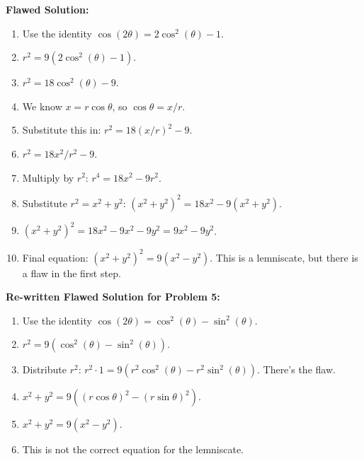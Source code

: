 \documentclass{article}
\begin{document}
\textbf{Flawed Solution:}
\begin{enumerate}
    \item Use the identity \(\cos(2\theta) = 2\cos^2(\theta) - 1\).
    \item \(r^2 = 9(2\cos^2(\theta) - 1)\).
    \item \(r^2 = 18\cos^2(\theta) - 9\).
    \item We know \(x = r\cos\theta\), so \(\cos\theta = x/r\).
    \item Substitute this in: \(r^2 = 18(x/r)^2 - 9\).
    \item \(r^2 = 18x^2/r^2 - 9\).
    \item Multiply by \(r^2\): \(r^4 = 18x^2 - 9r^2\).
    \item Substitute \(r^2 = x^2+y^2\): \((x^2+y^2)^2 = 18x^2 - 9(x^2+y^2)\).
    \item \((x^2+y^2)^2 = 18x^2 - 9x^2 - 9y^2 = 9x^2 - 9y^2\).
    \item Final equation: \((x^2+y^2)^2 = 9(x^2 - y^2)\). This is a lemniscate, but there is a flaw in the first step.
\end{enumerate}
\textbf{Re-written Flawed Solution for Problem 5:}
\begin{enumerate}
    \item Use the identity \(\cos(2\theta) = \cos^2(\theta) - \sin^2(\theta)\).
    \item \(r^2 = 9(\cos^2(\theta) - \sin^2(\theta))\).
    \item Distribute \(r^2\): \(r^2 \cdot 1 = 9(r^2\cos^2(\theta) - r^2\sin^2(\theta))\). There's the flaw.
    \item \(x^2+y^2 = 9((r\cos\theta)^2 - (r\sin\theta)^2)\).
    \item \(x^2+y^2 = 9(x^2 - y^2)\).
    \item This is not the correct equation for the lemniscate.
\end{enumerate}
\end{document}
